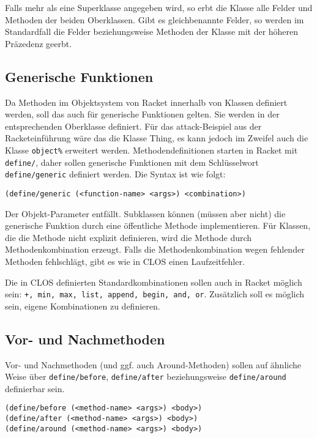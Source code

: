 Falls mehr als eine Superklasse angegeben wird, so erbt die Klasse alle Felder und Methoden der beiden Oberklassen. Gibt es gleichbenannte Felder, so werden im Standardfall die Felder beziehungsweise Methoden der Klasse mit der höheren Präzedenz geerbt.

\subsection{Generische Funktionen}
Da Methoden im Objektsystem von Racket innerhalb von Klassen definiert werden, soll das auch für generische Funktionen gelten. Sie werden in der entsprechenden Oberklasse definiert. Für das attack-Beispiel aus der Racketeinführung wäre das die Klasse Thing, es kann jedoch im Zweifel auch die Klasse \texttt{object\%} erweitert werden. Methodendefinitionen starten in Racket mit \texttt{define/}, daher sollen generische Funktionen mit dem Schlüsselwort \texttt{define/generic} definiert werden. Die Syntax ist wie folgt:

\texttt{(define/generic ({\textless}function-name{\textgreater} {\textless}args{\textgreater}) {\textless}combination{\textgreater})}

Der Objekt-Parameter entfällt. Subklassen können (müssen aber nicht) die generische Funktion durch eine öffentliche Methode implementieren. Für Klassen, die die Methode nicht explizit definieren, wird die Methode durch Methodenkombination erzeugt. Falls die Methodenkombination wegen fehlender Methoden fehlschlägt, gibt es wie in CLOS einen Laufzeitfehler.

Die in CLOS definierten Standardkombinationen sollen auch in Racket möglich sein: \texttt{+, min, max, list, append, begin, and, or}. 
Zusätzlich soll es möglich sein, eigene Kombinationen zu definieren.


\subsection{Vor- und Nachmethoden}
Vor- und Nachmethoden (und ggf. auch Around-Methoden) sollen auf ähnliche Weise über \texttt{define/before}, \texttt{define/after} beziehungsweise \texttt{define/around} definierbar sein. 

\texttt{(define/before ({\textless}method-name{\textgreater} {\textless}args{\textgreater}) {\textless}body{\textgreater})}\\
\texttt{(define/after ({\textless}method-name{\textgreater} {\textless}args{\textgreater}) {\textless}body{\textgreater})}\\
\texttt{(define/around ({\textless}method-name{\textgreater} {\textless}args{\textgreater}) {\textless}body{\textgreater})}


